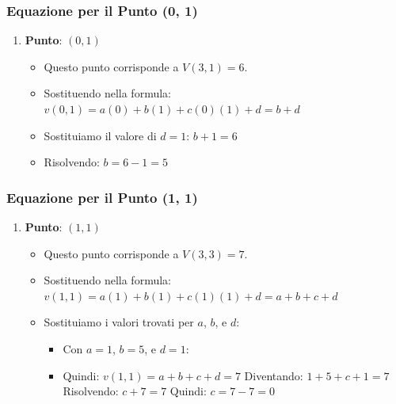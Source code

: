 \subsubsection{Equazione per il Punto (0,
1)}\label{equazione-per-il-punto-0-1}

\begin{enumerate}
\def\labelenumi{\arabic{enumi}.}
\tightlist
\item
  \textbf{Punto}: \((0, 1)\)

  \begin{itemize}
  \tightlist
  \item
    Questo punto corrisponde a \(V(3, 1) = 6\).
  \item
    Sostituendo nella formula:
    \(v(0, 1) = a(0) + b(1) + c(0)(1) + d = b + d\)
  \item
    Sostituiamo il valore di \(d = 1\): \(b + 1 = 6\)
  \item
    Risolvendo: \(b = 6 - 1 = 5\)
  \end{itemize}
\end{enumerate}

\subsubsection{Equazione per il Punto (1,
1)}\label{equazione-per-il-punto-1-1}

\begin{enumerate}
\def\labelenumi{\arabic{enumi}.}
\tightlist
\item
  \textbf{Punto}: \((1, 1)\)

  \begin{itemize}
  \tightlist
  \item
    Questo punto corrisponde a \(V(3, 3) = 7\).
  \item
    Sostituendo nella formula:
    \(v(1, 1) = a(1) + b(1) + c(1)(1) + d = a + b + c + d\)
  \item
    Sostituiamo i valori trovati per \(a\), \(b\), e \(d\):

    \begin{itemize}
    \tightlist
    \item
      Con \(a=1\), \(b=5\), e \(d=1\):
    \item
      Quindi: \(v(1, 1)=a+b+c+d=7\) Diventando: \(1 + 5 + c + 1 = 7\)
      Risolvendo: \(c + 7 = 7\) Quindi: \(c=7-7=0\)
    \end{itemize}
  \end{itemize}
\end{enumerate}

